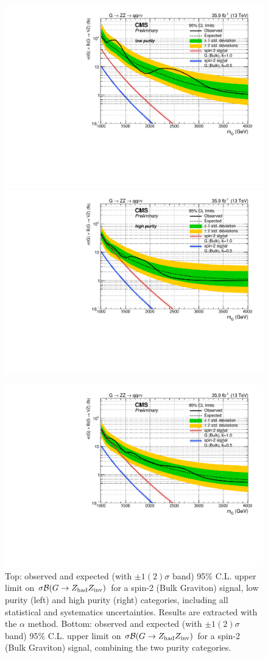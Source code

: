 \begin{figure}[!htb]
  \begin{center}
     \includegraphics[width=.495\textwidth]{v9/plotsAlpha/Limits/Exclusion_XZZInv_XVZnnlp1p0_asymptotic.pdf}%
     \includegraphics[width=.495\textwidth]{v9/plotsAlpha/Limits/Exclusion_XZZInv_XVZnnhp1p0_asymptotic.pdf}

     \includegraphics[width=.495\textwidth]{v9/plotsAlpha/Limits/Exclusion_XZZInv_XVZnn1p0_asymptotic.pdf}
  \end{center}
  \caption{Top: observed and expected (with $\pm1(2)\sigma$ band) 95\% C.L. upper limit on $\sigma \mathcal{B} (G \rightarrow Z_{\text{had}} Z_{\text{inv}})$ for a spin-2 (Bulk Graviton) signal, low purity (left) and high purity (right) categories, including all statistical and systematics uncertainties. Results are extracted with the $\alpha$ method. Bottom: observed and expected (with $\pm1(2)\sigma$ band) 95\% C.L. upper limit on $\sigma \mathcal{B} (G \rightarrow Z_{\text{had}} Z_{\text{inv}})$ for a spin-2 (Bulk Graviton) signal, combining the two purity categories.}
  \label{fig:Limit_XZZInv}
\end{figure}

